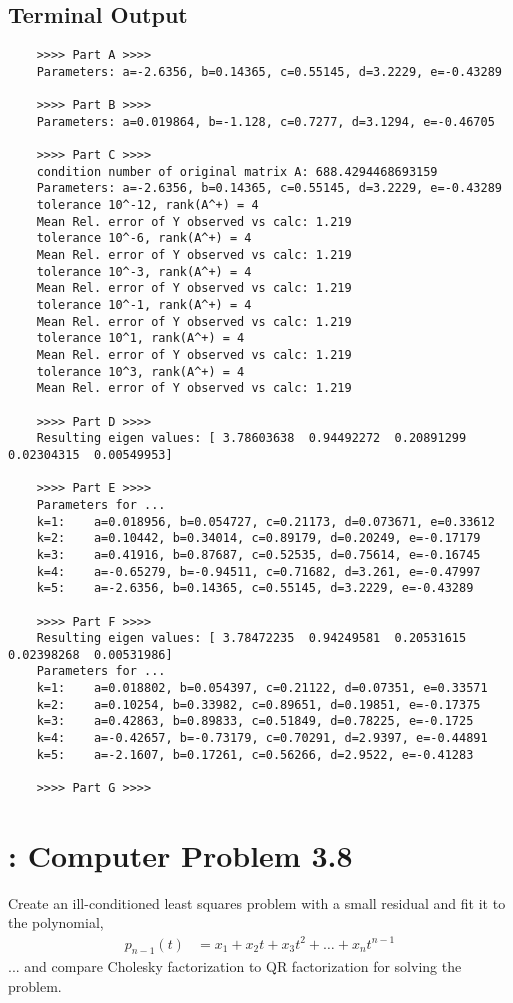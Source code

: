 \documentclass[paper=a4, fontsize=11pt]{scrartcl}
\numberwithin{equation}{section}		%
\numberwithin{figure}{section}			%
\numberwithin{table}{section}				%
\begin{document}
\subsection{Terminal Output}
\begin{verbatim}
	>>>> Part A >>>>
	Parameters: a=-2.6356, b=0.14365, c=0.55145, d=3.2229, e=-0.43289
	
	>>>> Part B >>>>
	Parameters: a=0.019864, b=-1.128, c=0.7277, d=3.1294, e=-0.46705
	
	>>>> Part C >>>>
	condition number of original matrix A: 688.4294468693159
	Parameters: a=-2.6356, b=0.14365, c=0.55145, d=3.2229, e=-0.43289
	tolerance 10^-12, rank(A^+) = 4
	Mean Rel. error of Y observed vs calc: 1.219
	tolerance 10^-6, rank(A^+) = 4
	Mean Rel. error of Y observed vs calc: 1.219
	tolerance 10^-3, rank(A^+) = 4
	Mean Rel. error of Y observed vs calc: 1.219
	tolerance 10^-1, rank(A^+) = 4
	Mean Rel. error of Y observed vs calc: 1.219
	tolerance 10^1, rank(A^+) = 4
	Mean Rel. error of Y observed vs calc: 1.219
	tolerance 10^3, rank(A^+) = 4
	Mean Rel. error of Y observed vs calc: 1.219
	
	>>>> Part D >>>>
	Resulting eigen values: [ 3.78603638  0.94492272  0.20891299  0.02304315  0.00549953]

	>>>> Part E >>>>
	Parameters for ...
	k=1:    a=0.018956, b=0.054727, c=0.21173, d=0.073671, e=0.33612
	k=2:    a=0.10442, b=0.34014, c=0.89179, d=0.20249, e=-0.17179
	k=3:    a=0.41916, b=0.87687, c=0.52535, d=0.75614, e=-0.16745
	k=4:    a=-0.65279, b=-0.94511, c=0.71682, d=3.261, e=-0.47997
	k=5:    a=-2.6356, b=0.14365, c=0.55145, d=3.2229, e=-0.43289
	
	>>>> Part F >>>>
	Resulting eigen values: [ 3.78472235  0.94249581  0.20531615  0.02398268  0.00531986]
	Parameters for ...
	k=1:    a=0.018802, b=0.054397, c=0.21122, d=0.07351, e=0.33571
	k=2:    a=0.10254, b=0.33982, c=0.89651, d=0.19851, e=-0.17375
	k=3:    a=0.42863, b=0.89833, c=0.51849, d=0.78225, e=-0.1725
	k=4:    a=-0.42657, b=-0.73179, c=0.70291, d=2.9397, e=-0.44891
	k=5:    a=-2.1607, b=0.17261, c=0.56266, d=2.9522, e=-0.41283
	
	>>>> Part G >>>>

\end{verbatim}

\vspace{4mm}
\section{: Computer Problem 3.8}
Create an ill-conditioned least squares problem with a small residual and fit it to the polynomial,
\begin{align}
	p_{n-1}(t) &= x_1 + x_2 t + x_3 t^2 + \dots + x_n t^{n-1}
\end{align}
... and compare Cholesky factorization to QR factorization for solving the problem.
\end{document}

